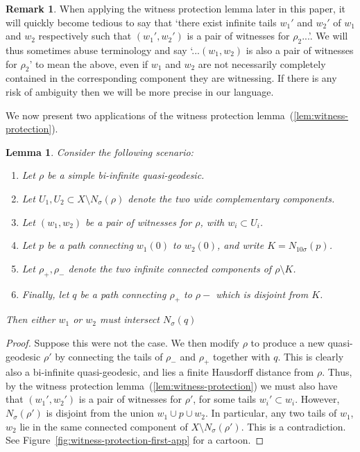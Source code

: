 \documentclass[11pt,a4paper]{amsart}
\DeclareMathOperator{\dist}{d}
\newtheorem{lemma}[theorem]{Lemma}
\theoremstyle{definition}
\newtheorem{remark}[theorem]{Remark}
\begin{document}
\begin{remark}
    When applying the witness protection lemma later in this paper, it will quickly become tedious to say that `there exist infinite tails $w_1'$ and $w_2'$ of $w_1$ and $w_2$ respectively such that $(w_1', w_2')$ is a pair of witnesses for $\rho_2$...'. We will thus sometimes abuse terminology and say `...$(w_1, w_2)$ is also a pair of witnesses for $\rho_2$' to mean the above, even if $w_1$ and $w_2$ are not necessarily completely contained in the corresponding component they are witnessing. If there is any risk of ambiguity then we will be more precise in our language. 
\end{remark}

We now present two applications of the witness protection lemma~(\ref{lem:witness-protection}). 

\begin{lemma}\label{lem:witness-intersects-q}
    Consider the following scenario:
    \begin{enumerate}
        \item Let $\rho$ be a simple bi-infinite quasi-geodesic.

        \item Let $U_1, U_2 \subset X\setminus N_\sigma(\rho)$ denote the two wide complementary components.

        \item Let $(w_1, w_2)$ be a pair of witnesses for $\rho$, with $ w_i \subset U_i$. 

        \item Let $p$ be a path connecting $w_1(0)$ to $w_2(0)$, and write $K = N_{10\sigma}(p)$.

        \item Let $\rho_+, \rho_-$ denote the two infinite connected components of $\rho \setminus K$.

        \item Finally, let $q$ be a path connecting $\rho_+$ to $\rho-$ which is disjoint from $K$.
    \end{enumerate}
    Then either $w_1$ or $w_2$ must intersect $N_\sigma(q)$ 
\end{lemma}

\begin{proof}
    Suppose this were not the case. We then modify $\rho$ to produce a new quasi-geodesic $\rho'$ by connecting the tails of $\rho_-$ and $\rho_+$ together with $q$. This is clearly also a bi-infinite quasi-geodesic, and lies a finite Hausdorff distance from $\rho$. Thus, by the witness protection lemma~(\ref{lem:witness-protection}) we must also have that $(w_1', w_2')$ is a pair of witnesses for $\rho'$, for some tails $w_i' \subset w_i$. However, $N_{\sigma}(\rho')$ is disjoint from the union $w_1 \cup p \cup w_2$. In particular, any two tails of $w_1$, $w_2$ lie in the same connected component of $X \setminus N_\sigma(\rho')$. This is a contradiction. See Figure~\ref{fig:witness-protection-first-app} for a cartoon.
\end{proof}
\end{document}
